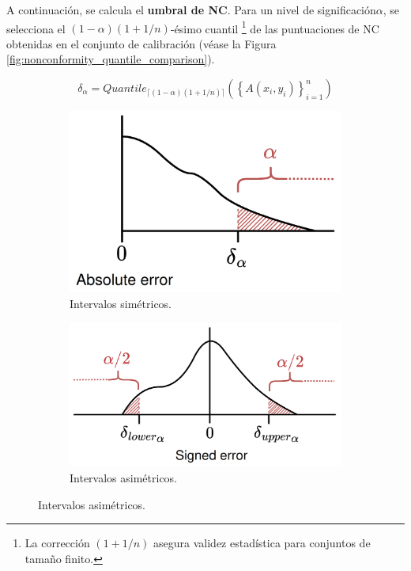 \begin{enumerate}
    A continuación, se calcula el \textbf{umbral de \acrshort{NC}}. Para un nivel de significación$\alpha$, se selecciona el $(1 - \alpha)(1 + 1/n)$-ésimo cuantil%
    \footnote{
        La corrección $(1 + 1/n)$ asegura validez estadística para conjuntos de tamaño finito.
    } 
    de las puntuaciones de \acrshort{NC} obtenidas en el conjunto de calibración (véase la Figura \ref{fig:nonconformity_quantile_comparison}).

    $$
    \delta_\alpha = Quantile_{ \lceil  (1-\alpha) (1 + 1/n)  \rceil } ( \left\{ A(x_i,y_i) \right\}_{i=1}^n )
    $$

    \begin{figure}[htbp]
        \centering

        \begin{subfigure}[b]{0.48\textwidth}
            \centering
            \includegraphics[width=\textwidth]{capitulos/cap_02/imagenes/nonconformity_quantile_threshold_simetric.png}
            \caption{Intervalos simétricos.}
            \label{fig:nonconformity_quantile_threshold_simetric}
        \end{subfigure}
        \hfill
        \begin{subfigure}[b]{0.49\textwidth}
            \centering
            \includegraphics[width=\textwidth]{capitulos/cap_02/imagenes/nonconformity_quantile_threshold_asimetric.png}
            \caption{Intervalos asimétricos.}
            \label{fig:nonconformity_quantile_threshold_asimetric}
        \end{subfigure}


\end{figure}
\end{enumerate}
